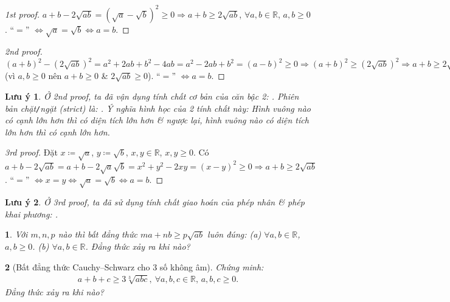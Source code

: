 \documentclass{article}
\newtheorem{baitoan}{}
\newtheorem{luuy}{Lưu ý}
\begin{document}
\begin{proof}[1st proof]
	$a + b - 2\sqrt{ab} = (\sqrt{a} - \sqrt{b})^2\ge0\Rightarrow a + b\ge2\sqrt{ab}$, $\forall a,b\in\mathbb{R}$, $a,b\ge 0$. ``$=$'' $\Leftrightarrow\sqrt{a} = \sqrt{b}\Leftrightarrow a = b$.
\end{proof}

\begin{proof}[2nd proof]
	$(a + b)^2 - (2\sqrt{ab})^2 = a^2 + 2ab + b^2 - 4ab = a^2 - 2ab + b^2 = (a - b)^2\ge0\Rightarrow(a + b)^2\ge(2\sqrt{ab})^2\Rightarrow a + b\ge2\sqrt{ab}$ (vì $a,b\ge0$ nên $a + b\ge0$ \& $2\sqrt{ab}\ge0$). ``$=$'' $\Leftrightarrow a = b$.
\end{proof}

\begin{luuy}
	Ở 2nd proof, ta đã vận dụng tính chất cơ bản của căn bậc 2: . Phiên bản chặt\emph{\texttt{/}}ngặt (strict) là: . Ý nghĩa hình học của 2 tính chất này: Hình vuông nào có cạnh lớn hơn thì có diện tích lớn hơn \& ngược lại, hình vuông nào có diện tích lớn hơn thì có cạnh lớn hơn.
\end{luuy}

\begin{proof}[3rd proof]
	Đặt $x\coloneqq\sqrt{a}$, $y\coloneqq\sqrt{b}$, $x,y\in\mathbb{R}$, $x,y\ge0$. Có $a + b - 2\sqrt{ab} = a + b - 2\sqrt{a}\sqrt{b} = x^2 + y^2 - 2xy = (x - y)^2\ge0\Rightarrow a + b\ge2\sqrt{ab}$. ``$=$'' $\Leftrightarrow x = y\Leftrightarrow\sqrt{a} = \sqrt{b}\Leftrightarrow a = b$.
\end{proof}

\begin{luuy}
	Ở 3rd proof, ta đã sử dụng tính chất giao hoán của phép nhân \& phép khai phương: .
\end{luuy}

\begin{baitoan}
	Với $m,n,p$ nào thì bất đẳng thức $ma + nb\ge p\sqrt{ab}$ luôn đúng: (a) $\forall a,b\in\mathbb{R}$, $a,b\ge0$. (b) $\forall a,b\in\mathbb{R}$. Đẳng thức xảy ra khi nào?
\end{baitoan}

\begin{baitoan}[Bất đẳng thức Cauchy--Schwarz cho 3 số không âm]
	Chứng minh:
	\begin{align*}
		\boxed{a + b + c\ge3\sqrt[3]{abc},\ \forall a,b,c\in\mathbb{R},\,a,b,c\ge 0.}
	\end{align*}
	Đẳng thức xảy ra khi nào?
\end{baitoan}
\end{document}
